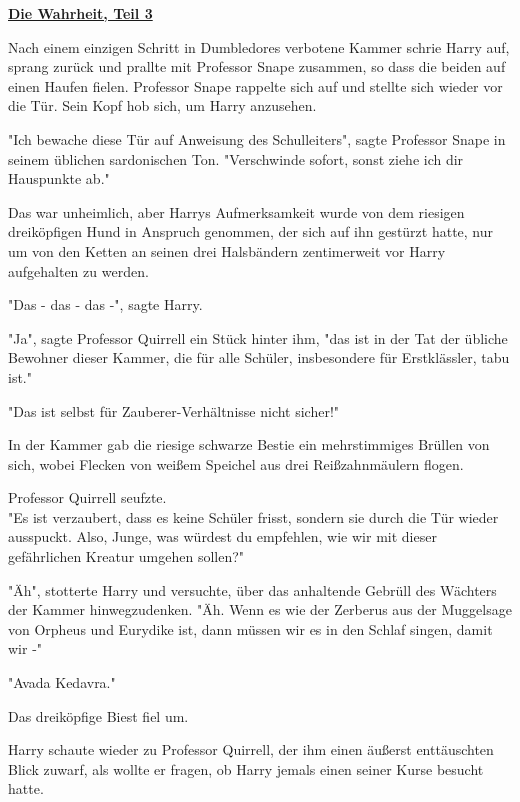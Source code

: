

\hypertarget{die-wahrheit-teil-3}{%

\textbf{\uline{Die Wahrheit, Teil 3}}

Nach einem einzigen Schritt in Dumbledores verbotene Kammer schrie Harry auf, sprang zurück und prallte mit Professor Snape zusammen, so dass die beiden auf einen Haufen fielen. Professor Snape rappelte sich auf und stellte sich wieder vor die Tür. Sein Kopf hob sich, um Harry anzusehen.

"Ich bewache diese Tür auf Anweisung des Schulleiters", sagte Professor Snape in seinem üblichen sardonischen Ton. "Verschwinde sofort, sonst ziehe ich dir Hauspunkte ab."

Das war unheimlich, aber Harrys Aufmerksamkeit wurde von dem riesigen dreiköpfigen Hund in Anspruch genommen, der sich auf ihn gestürzt hatte, nur um von den Ketten an seinen drei Halsbändern zentimerweit vor Harry aufgehalten zu werden.

"Das - das - das -", sagte Harry.

"Ja", sagte Professor Quirrell ein Stück hinter ihm, "das ist in der Tat der übliche Bewohner dieser Kammer, die für alle Schüler, insbesondere für Erstklässler, tabu ist."

"Das ist selbst für Zauberer-Verhältnisse nicht sicher!"

In der Kammer gab die riesige schwarze Bestie ein mehrstimmiges Brüllen von sich, wobei Flecken von weißem Speichel aus drei Reißzahnmäulern flogen.

Professor Quirrell seufzte.\\ "Es ist verzaubert, dass es keine Schüler frisst, sondern sie durch die Tür wieder ausspuckt. Also, Junge, was würdest du empfehlen, wie wir mit dieser gefährlichen Kreatur umgehen sollen?"

"Äh", stotterte Harry und versuchte, über das anhaltende Gebrüll des Wächters der Kammer hinwegzudenken. "Äh. Wenn es wie der Zerberus aus der Muggelsage von Orpheus und Eurydike ist, dann müssen wir es in den Schlaf singen, damit wir -"

"Avada Kedavra."

Das dreiköpfige Biest fiel um.

Harry schaute wieder zu Professor Quirrell, der ihm einen äußerst enttäuschten Blick zuwarf, als wollte er fragen, ob Harry jemals einen seiner Kurse besucht hatte.

}
